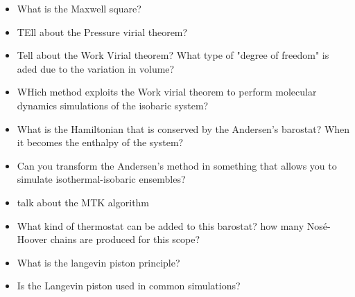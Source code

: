 \begin{enumerate}
\begin{itemize}
        \item What is the Maxwell square?
        \item TEll about the Pressure virial theorem?
        \item Tell about the Work Virial theorem? What type of "degree of freedom" is aded due to the variation in volume?
        \item WHich method exploits the Work virial theorem to perform molecular dynamics simulations of the isobaric system?
        \item What is the Hamiltonian that is conserved by the Andersen's barostat? When it becomes the enthalpy of the system?
        \item Can you transform the Andersen's method in something that allows you to simulate isothermal-isobaric ensembles?
        \item talk about the MTK algorithm
        \item What kind of thermostat can be added to this barostat? how many Nosé-Hoover chains are produced for this scope?
        \item What is the langevin piston principle?
        \item Is the Langevin piston used in common simulations?
    \end{itemize}

\end{enumerate}
